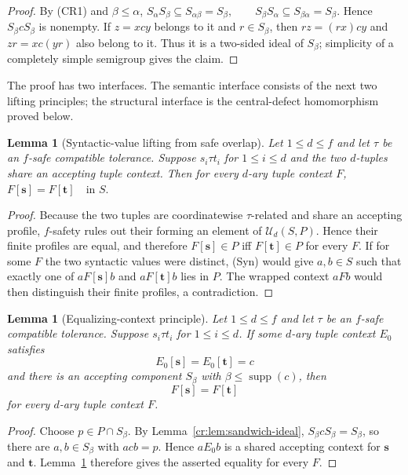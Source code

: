 \documentclass[10pt,a4paper]{article}
\newtheorem{lemma}[theorem]{Lemma}
\theoremstyle{definition}
\theoremstyle{remark}
\begin{document}
\begin{proof}
By \textup{(CR1)} and \(\beta\le\alpha\),
\(
S_\alpha S_\beta\subseteq S_{\alpha\beta}=S_\beta,
\qquad
S_\beta S_\alpha\subseteq S_{\beta\alpha}=S_\beta.
\)
Hence \(S_\beta cS_\beta\) is nonempty.  If $z=xcy$ belongs to it and
$r\in S_\beta$, then $rz=(rx)cy$ and $zr=xc(yr)$ also belong to it.  Thus it
is a two-sided ideal of $S_\beta$; simplicity of a completely simple
semigroup gives the claim.
\end{proof}

The proof has two interfaces.  The semantic interface consists of the next
two lifting principles; the structural interface is the central-defect
homomorphism proved below.

\begin{lemma}[Syntactic-value lifting from safe overlap]
\label{cr:lem:syntactic-lifting}
Let $1\le d\le f$ and let $\tau$ be an $f$-safe compatible tolerance.  Suppose
$s_i\tau t_i$ for $1\le i\le d$ and the two $d$-tuples share an accepting
tuple context.  Then for every $d$-ary tuple context $F$,
\(F[\mathbf s]=F[\mathbf t]\quad\text{in }S.\)
\end{lemma}

\begin{proof}
Because the two tuples are coordinatewise $\tau$-related and share an
accepting profile, $f$-safety rules out their forming an element of
$\mathcal U_d(S,P)$.  Hence their finite profiles are equal, and therefore
$F[\mathbf s]\in P$ iff $F[\mathbf t]\in P$ for every $F$.  If for some $F$
the two syntactic values were distinct, \textup{(Syn)} would give $a,b\in S$
such that exactly one of $aF[\mathbf s]b$ and $aF[\mathbf t]b$ lies in $P$.
The wrapped context $aFb$ would then distinguish their finite profiles, a
contradiction.
\end{proof}

\begin{lemma}[Equalizing-context principle]
\label{cr:lem:equalizing-context}
Let $1\le d\le f$ and let $\tau$ be an $f$-safe compatible tolerance.
Suppose $s_i\tau t_i$ for $1\le i\le d$.  If some $d$-ary tuple context
$E_0$ satisfies
\[
E_0[\mathbf s]=E_0[\mathbf t]=c
\]
and there is an accepting component $S_\beta$ with
$\beta\le\operatorname{supp}(c)$, then
\[
F[\mathbf s]=F[\mathbf t]
\]
for every $d$-ary tuple context $F$.
\end{lemma}

\begin{proof}
Choose $p\in P\cap S_\beta$.  By
Lemma~\ref{cr:lem:sandwich-ideal}, $S_\beta cS_\beta=S_\beta$, so there are
$a,b\in S_\beta$ with $acb=p$.  Hence $aE_0b$ is a shared accepting context
for $\mathbf s$ and $\mathbf t$.  Lemma~\ref{cr:lem:syntactic-lifting}
therefore gives the asserted equality for every $F$.
\end{proof}
\end{document}

